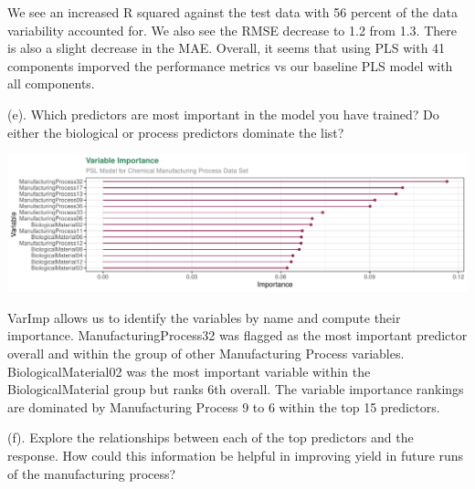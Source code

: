 \documentclass[]{report}
\begin{document}
We see an increased R squared against the test data with 56 percent of
the data variability accounted for. We also see the RMSE decrease to 1.2
from 1.3. There is also a slight decrease in the MAE. Overall, it seems
that using PLS with 41 components imporved the performance metrics vs
our baseline PLS model with all components.

\begin{subquestion}{(e).} Which predictors are most important in the model you have trained? Do either the biological or process predictors dominate the list? 
\end{subquestion}

\includegraphics{Homework-Two_files/figure-latex/kj-6.3e-1.pdf}

VarImp allows us to identify the variables by name and compute their
importance. ManufacturingProcess32 was flagged as the most important
predictor overall and within the group of other Manufacturing Process
variables. BiologicalMaterial02 was the most important variable within
the BiologicalMaterial group but ranks 6th overall. The variable
importance rankings are dominated by Manufacturing Process 9 to 6 within
the top 15 predictors.

\begin{subquestion}{(f).} Explore the relationships between each of the top predictors and the response. How could this information be helpful in improving yield in future runs of the manufacturing process?
\end{subquestion}
\end{document}
